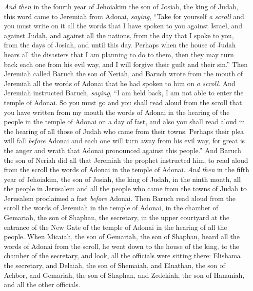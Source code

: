\begin{biblechapter} %
 \textit{And then} in the fourth year of Jehoiakim the son of Josiah, the king of Judah, this word came to Jeremiah from Adonai, \textit{saying},
\verse “Take for yourself \textit{a scroll} and you must write on it all the words that I have spoken to you against Israel, and against Judah, and against all the nations, from the day that I spoke to you, from the days of Josiah, and until this day.
\verse Perhaps when the house of Judah hears all the disasters that I am planning to do to them, then they may turn back each one from his evil way, and I will forgive their guilt and their sin.”
\verse Then Jeremiah called Baruch the son of Neriah, and Baruch wrote from the mouth of Jeremiah all the words of Adonai that he had spoken to him on \textit{a scroll}.
\verse And Jeremiah instructed Baruch, \textit{saying}, “I am held back, I am not able to enter the temple of Adonai.
\verse So you must go and you shall read aloud from the scroll that you have written from my mouth the words of Adonai in the hearing of the people in the temple of Adonai on a day of fast, and also you shall read aloud in the hearing of all those of Judah who came from their towns.
\verse Perhaps their plea will fall \textit{before} Adonai and each one will turn away from his evil way, for great is the anger and wrath that Adonai pronounced against this people.”
\verse And Baruch the son of Neriah did all that Jeremiah the prophet instructed him, to read aloud from the scroll the words of Adonai in the temple of Adonai.
\verse \textit{And then} in the fifth year of Jehoiakim, the son of Josiah, the king of Judah, in the ninth month, all the people in Jerusalem and all the people who came from the towns of Judah to Jerusalem proclaimed a fast \textit{before} Adonai.
\verse Then Baruch read aloud from the scroll the words of Jeremiah in the temple of Adonai, in the chamber of Gemariah, the son of Shaphan, the secretary, in the upper courtyard at the entrance of the New Gate of the temple of Adonai in the hearing of all the people.
\verse When Micaiah, the son of Gemariah, the son of Shaphan, heard all the words of Adonai from the scroll,
\verse he went down to the house of the king, to the chamber of the secretary, and look, all the officials were sitting there: Elishama the secretary, and Delaiah, the son of Shemaiah, and Elnathan, the son of Achbor, and Gemariah, the son of Shaphan, and Zedekiah, the son of Hananiah, and all the other officials.

\end{biblechapter}
